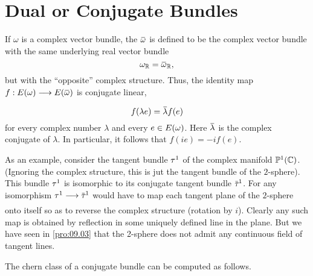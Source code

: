 \documentclass[../main]{subfiles}
\begin{document}
\section{Dual or Conjugate Bundles}


If $\omega$ is a complex vector bundle, the  $\xoverline{\omega}$ is defined to be the complex vector bundle with the same underlying real vector bundle \[\omega_\bR = \xoverline\omega_\bR,\] but with the ``opposite'' complex structure. Thus, the identity map \newline $f:\total(\omega)\varrightarrow{} \total(\xoverline\omega)$ is conjugate linear, \[f(\lambda e) = \xoverline{\lambda}f(e)\] for every complex number $\lambda$ and every $e\in E(\omega)$. Here $\xoverline\lambda$ is the complex conjugate of $\lambda$. In particular, it follows that $f(ie) = -if(e)$.

As an example, consider the tangent bundle $\tau_{}^1$ of the complex manifold $\mathbb{P}^1(\mathbb C)$.(Ignoring the complex structure, this is jut the tangent bundle of the $2$-sphere). This bundle $\tau_{}^1$ is  isomorphic to its conjugate tangent bundle $\xoverline{\tangentbundle{}}^1$. For any isomorphism $\tangentbundle{}^1\varrightarrow{}\xoverline{\tangentbundle{}}^1$ would have to map each tangent plane of the $2$-sphere onto itself so as to reverse the complex structure (rotation by $i$). Clearly any such map is obtained by reflection in some uniquely defined line in the plane. But we have seen in \ref{pro:09.03} that the 2-sphere does not admit any continuous field of tangent lines.

The chern class of a conjugate bundle can be computed as follows.
\end{document}
